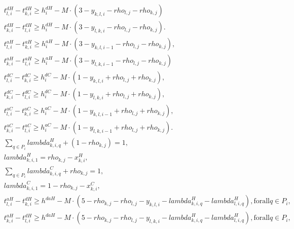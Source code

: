 \begin{align}
  & t_{l,i}^{dH} - t_{k,i}^{dH} \geq h_{i}^{dH} - M \cdot (3 - y_{k,l,i} - \mathit{rho}_{l,j} - \mathit{rho}_{k,j}) \tag{eq\_0015} \\
  & t_{k , i}^{d H} - t_{l , i}^{d H} \geq h_{i}^{d H} - M \cdot \left(3 - y_{l , k , i} - \mathit{rho}_{l , j} - \mathit{rho}_{k , j}\right) . \tag{eq\_0016} \\
  & t_{l , i}^{a H} - t_{k , i}^{a H} \geq h_{i}^{a H} - M \cdot \left(3 - y_{k , l , i - 1} - \mathit{rho}_{l , j} - \mathit{rho}_{k , j}\right) , \tag{eq\_0017} \\
  & t_{k , i}^{a H} - t_{l , i}^{a H} \geq h_{i}^{a H} - M \cdot \left(3 - y_{l , k , i - 1} - \mathit{rho}_{l , j} - \mathit{rho}_{k , j}\right) \tag{eq\_0018} \\
  & t_{l , i}^{d C} - t_{k , i}^{d C} \geq h_{i}^{d C} - M \cdot \left(1 - y_{k , l , i} + \mathit{rho}_{l , j} + \mathit{rho}_{k , j}\right) , \tag{eq\_0019} \\
  & t_{k , i}^{d C} - t_{l , i}^{d C} \geq h_{i}^{d C} - M \cdot \left(1 - y_{l , k , i} + \mathit{rho}_{l , j} + \mathit{rho}_{k , j}\right) , \tag{eq\_0020} \\
  & t_{l , i}^{a C} - t_{k , i}^{a C} \geq h_{i}^{a C} - M \cdot \left(1 - y_{k , l , i - 1} + \mathit{rho}_{l , j} + \mathit{rho}_{k , j}\right) , \tag{eq\_0021} \\
  & t_{k , i}^{a C} - t_{l , i}^{a C} \geq h_{i}^{a C} - M \cdot \left(1 - y_{l , k , i - 1} + \mathit{rho}_{l , j} + \mathit{rho}_{k , j}\right) . \tag{eq\_0022} \\
  & \sum_{q \in P_{i}} \mathit{lambda}_{k , i , q}^{H} + \left(1 - \mathit{rho}_{k , j}\right) = 1 , \tag{eq\_0023} \\
  & \mathit{lambda}_{k , i , 1}^{H} = \mathit{rho}_{k , j} - x_{k , i}^{H} , \tag{eq\_0024} \\
  & \sum_{q \in P_{i}} \mathit{lambda}_{k , i , q}^{C} + \mathit{rho}_{k , j} = 1 , \tag{eq\_0025} \\
  & \mathit{lambda}_{k , i , 1}^{C} = 1 - \mathit{rho}_{k , j} - x_{k , i}^{C} , \tag{eq\_0026} \\
  & t_{l , i}^{a H} - t_{k , i}^{d H} \geq h^{d a H} - M \cdot \left(5 - \mathit{rho}_{k , j} - \mathit{rho}_{l , j} - y_{k , l , i} - \mathit{lambda}_{k , i , q}^{H} - \mathit{lambda}_{l , i , q}^{H}\right) , \text{for} \text{all} q \in P_{i} , \tag{eq\_0028} \\
  & t_{k , i}^{a H} - t_{l , i}^{d H} \geq h^{d a H} - M \cdot \left(5 - \mathit{rho}_{k , j} - \mathit{rho}_{l , j} - y_{l , k , i} - \mathit{lambda}_{k , i , q}^{H} - \mathit{lambda}_{l , i , q}^{H}\right) , \text{for} \text{all} q \in P_{i} , \tag{eq\_0029} \\

\end{align}
